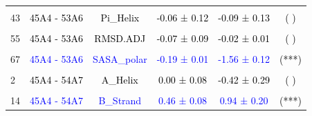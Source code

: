 \documentclass{article}\usepackage[table]{xcolor}
\renewcommand{\$}{$} %
\begin{document}
\begin{center}
\begin{longtable}[t]{lccccc}
\cellcolor{gray!6}{37} & \cellcolor{gray!6}{\textcolor{black}{45A4 - 53A6}} & \cellcolor{gray!6}{\textcolor{black}{NOE\_repl\_merged}} & \cellcolor{gray!6}{\textcolor{black}{-0.05 ± 0.05}} & \cellcolor{gray!6}{\textcolor{black}{-0.01 ± 0.00}} & \cellcolor{gray!6}{\textcolor{black}{( )}}\\
43 & \textcolor{black}{45A4 - 53A6} & \textcolor{black}{Pi\_Helix} & \textcolor{black}{-0.06 ± 0.12} & \textcolor{black}{-0.09 ± 0.13} & \textcolor{black}{( )}\\
\cellcolor{gray!6}{49} & \cellcolor{gray!6}{\textcolor{blue}{45A4 - 53A6}} & \cellcolor{gray!6}{\textcolor{blue}{Rgyr}} & \cellcolor{gray!6}{\textcolor{blue}{-0.03 ± 0.00}} & \cellcolor{gray!6}{\textcolor{blue}{-0.03 ± 0.00}} & \cellcolor{gray!6}{\textcolor{black}{(***)}}\\
55 & \textcolor{black}{45A4 - 53A6} & \textcolor{black}{RMSD.ADJ} & \textcolor{black}{-0.07 ± 0.09} & \textcolor{black}{-0.02 ± 0.01} & \textcolor{black}{( )}\\
\cellcolor{gray!6}{61} & \cellcolor{gray!6}{\textcolor{blue}{45A4 - 53A6}} & \cellcolor{gray!6}{\textcolor{blue}{SASA\_nonpolar}} & \cellcolor{gray!6}{\textcolor{blue}{-0.07 ± 0.01}} & \cellcolor{gray!6}{\textcolor{blue}{-0.54 ± 0.09}} & \cellcolor{gray!6}{\textcolor{black}{(***)}}\\
67 & \textcolor{blue}{45A4 - 53A6} & \textcolor{blue}{SASA\_polar} & \textcolor{blue}{-0.19 ± 0.01} & \textcolor{blue}{-1.56 ± 0.12} & \textcolor{black}{(***)}\\
\cellcolor{gray!6}{73} & \cellcolor{gray!6}{\textcolor{black}{45A4 - 53A6}} & \cellcolor{gray!6}{\textcolor{black}{ThreeTen\_Helix}} & \cellcolor{gray!6}{\textcolor{black}{0.08 ± 0.08}} & \cellcolor{gray!6}{\textcolor{black}{0.10 ± 0.11}} & \cellcolor{gray!6}{\textcolor{black}{( )}}\\
2 & \textcolor{black}{45A4 - 54A7} & \textcolor{black}{A\_Helix} & \textcolor{black}{0.00 ± 0.08} & \textcolor{black}{-0.42 ± 0.29} & \textcolor{black}{( )}\\
\cellcolor{gray!6}{8} & \cellcolor{gray!6}{\textcolor{blue}{45A4 - 54A7}} & \cellcolor{gray!6}{\textcolor{blue}{B\_Bridge}} & \cellcolor{gray!6}{\textcolor{blue}{0.16 ± 0.06}} & \cellcolor{gray!6}{\textcolor{blue}{0.20 ± 0.08}} & \cellcolor{gray!6}{\textcolor{black}{(*)}}\\
14 & \textcolor{blue}{45A4 - 54A7} & \textcolor{blue}{B\_Strand} & \textcolor{blue}{0.46 ± 0.08} & \textcolor{blue}{0.94 ± 0.20} & \textcolor{black}{(***)}\\

\end{longtable}
\end{center}
\end{document}
